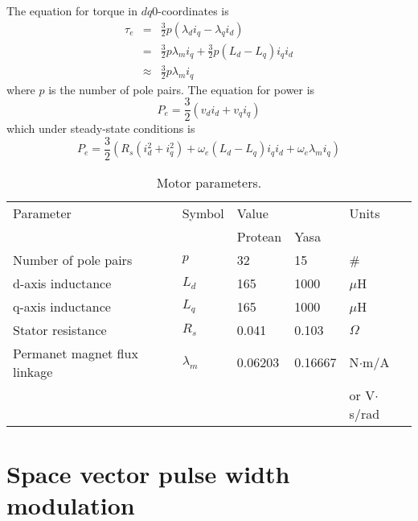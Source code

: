 \documentclass[11pt]{amsart}
\begin{document}
The equation for torque in $dq0$-coordinates is
%
\begin{eqnarray}
  \tau_e &=& \frac{3}{2} p (\lambda_d i_q - \lambda_q i_d) \\
         &=& \frac{3}{2} p \lambda_m i_q + \frac{3}{2} p (L_d - L_q) i_q i_d \\
         &\approx& \frac{3}{2} p \lambda_m i_q
\end{eqnarray}
%
where $p$ is the number of pole pairs.  The equation for power is
%
\begin{equation}
  P_e = \frac{3}{2} (v_d i_d + v_q i_q)
\end{equation}
%
which under steady-state conditions is
%
\begin{equation}
  P_e = \frac{3}{2}
  \left(
    R_s (i_d^2 + i_q^2) + \omega_e (L_d - L_q) i_q i_d + \omega_e \lambda_m i_q
  \right)
\end{equation}


\begin{table}
  \begin{tabular}{lllll}
    \hline
    \hline
    Parameter                    & Symbol      & Value   &         & Units \\
                                 &             & Protean & Yasa    & \\
    \hline
    Number of pole pairs         & $p$         & 32      & 15      & \# \\
    d-axis inductance            & $L_d$       & 165     & 1000    & $\mu$H \\
    q-axis inductance            & $L_q$       & 165     & 1000    & $\mu$H \\
    Stator resistance            & $R_s$       & 0.041   & 0.103   & $\Omega$ \\
    Permanet magnet flux linkage & $\lambda_m$ & 0.06203 & 0.16667 & N$\cdot$m/A \\
                                 &             &         &         & or V$\cdot$s/rad \\
    \hline
    \hline
  \end{tabular}
  \caption{Motor parameters\protect\footnotemark.}
\end{table}
%

\section{Space vector pulse width modulation}
\end{document}
